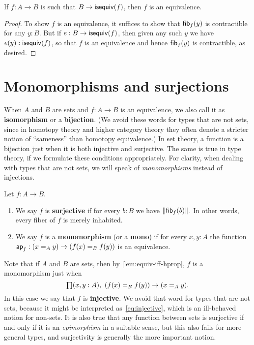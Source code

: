\begin{cor}\label{thm:equiv-inhabcod}
  If $f:A\to B$ is such that $B\to \isequiv(f)$, then $f$ is an equivalence.
\end{cor}
\begin{proof}
  To show $f$ is an equivalence, it suffices to show that $\hfib f y$ is contractible for any $y:B$.
  But if $e:B\to \isequiv(f)$, then given any such $y$ we have $e(y):\isequiv(f)$, so that $f$ is an equivalence and hence $\hfib f y$ is contractible, as desired.
\end{proof}


\section{Monomorphisms and surjections}
\label{sec:mono-surj}

When $A$ and $B$ are sets and $f:A\to B$ is an equivalence, we also call it as \textbf{isomorphism} or a \textbf{bijection}.
(We avoid these words for types that are not sets, since in homotopy theory and higher category theory they often denote a stricter notion of ``sameness'' than homotopy equivalence.)
In set theory, a function is a bijection just when it is both injective and surjective.
The same is true in type theory, if we formulate these conditions appropriately.
For clarity, when dealing with types that are not sets, we will speak of \emph{monomorphisms} instead of injections.

\begin{defn}
  Let $f:A\to B$.
  \begin{enumerate}
  \item We say $f$ is \textbf{surjective} if for every $b:B$ we have $\brck{\hfib f b}$.
    In other words, every fiber of $f$ is merely inhabited.
  \item We say $f$ is a \textbf{monomorphism} (or a \textbf{mono}) if for every $x,y:A$ the function $\apfunc f : (\id[A]xy) \to (\id[B]{f(x)}{f(y)})$ is an equivalence.
  \end{enumerate}
\end{defn}

Note that if $A$ and $B$ are sets, then by \autoref{lem:equiv-iff-hprop}, $f$ is a monomorphism just when
\begin{equation}
  \prd{x,y:A} (\id[B]{f(x)}{f(y)}) \to (\id[A]xy).\label{eq:injective}
\end{equation}
In this case we say that $f$ is \textbf{injective}.
We avoid that word for types that are not sets, because it might be interpreted as~\eqref{eq:injective}, which is an ill-behaved notion for non-sets.
It is also true that any function between sets is surjective if and only if it is an \emph{epimorphism} in a suitable sense, but this also fails for more general types, and surjectivity is generally the more important notion.

